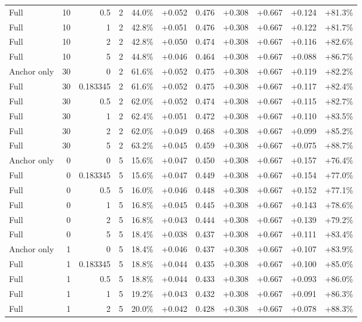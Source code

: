 \begin{table}[htbp]
\begin{tabular}{lrrrccccccc}
Full & 10 & 0.5 & 2 & 44.0\% & +0.052 & 0.476 & +0.308 & +0.667 & +0.124 & +81.3\% \\
Full & 10 & 1 & 2 & 42.8\% & +0.051 & 0.476 & +0.308 & +0.667 & +0.122 & +81.7\% \\
Full & 10 & 2 & 2 & 42.8\% & +0.050 & 0.474 & +0.308 & +0.667 & +0.116 & +82.6\% \\
Full & 10 & 5 & 2 & 44.8\% & +0.046 & 0.464 & +0.308 & +0.667 & +0.088 & +86.7\% \\
Anchor only & 30 & 0 & 2 & 61.6\% & +0.052 & 0.475 & +0.308 & +0.667 & +0.119 & +82.2\% \\
Full & 30 & 0.183345 & 2 & 61.6\% & +0.052 & 0.475 & +0.308 & +0.667 & +0.117 & +82.4\% \\
Full & 30 & 0.5 & 2 & 62.0\% & +0.052 & 0.474 & +0.308 & +0.667 & +0.115 & +82.7\% \\
Full & 30 & 1 & 2 & 62.4\% & +0.051 & 0.472 & +0.308 & +0.667 & +0.110 & +83.5\% \\
Full & 30 & 2 & 2 & 62.0\% & +0.049 & 0.468 & +0.308 & +0.667 & +0.099 & +85.2\% \\
Full & 30 & 5 & 2 & 63.2\% & +0.045 & 0.459 & +0.308 & +0.667 & +0.075 & +88.7\% \\
Anchor only & 0 & 0 & 5 & 15.6\% & +0.047 & 0.450 & +0.308 & +0.667 & +0.157 & +76.4\% \\
Full & 0 & 0.183345 & 5 & 15.6\% & +0.047 & 0.449 & +0.308 & +0.667 & +0.154 & +77.0\% \\
Full & 0 & 0.5 & 5 & 16.0\% & +0.046 & 0.448 & +0.308 & +0.667 & +0.152 & +77.1\% \\
Full & 0 & 1 & 5 & 16.8\% & +0.045 & 0.445 & +0.308 & +0.667 & +0.143 & +78.6\% \\
Full & 0 & 2 & 5 & 16.8\% & +0.043 & 0.444 & +0.308 & +0.667 & +0.139 & +79.2\% \\
Full & 0 & 5 & 5 & 18.4\% & +0.038 & 0.437 & +0.308 & +0.667 & +0.111 & +83.4\% \\
Anchor only & 1 & 0 & 5 & 18.4\% & +0.046 & 0.437 & +0.308 & +0.667 & +0.107 & +83.9\% \\
Full & 1 & 0.183345 & 5 & 18.8\% & +0.044 & 0.435 & +0.308 & +0.667 & +0.100 & +85.0\% \\
Full & 1 & 0.5 & 5 & 18.8\% & +0.044 & 0.433 & +0.308 & +0.667 & +0.093 & +86.0\% \\
Full & 1 & 1 & 5 & 19.2\% & +0.043 & 0.432 & +0.308 & +0.667 & +0.091 & +86.3\% \\
Full & 1 & 2 & 5 & 20.0\% & +0.042 & 0.428 & +0.308 & +0.667 & +0.078 & +88.3\% \\

\end{tabular}
\end{table}
